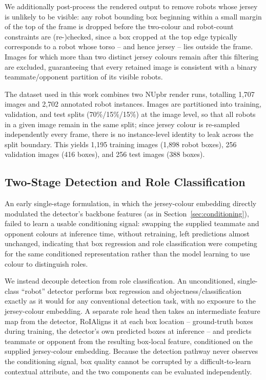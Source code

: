 \documentclass{article}
\begin{document}
We additionally post-process the rendered output to remove robots whose jersey is unlikely to be visible: any robot bounding box beginning within a small margin of the top of the frame is dropped before the two-colour and robot-count constraints are (re-)checked, since a box cropped at the top edge typically corresponds to a robot whose torso -- and hence jersey -- lies outside the frame. Images for which more than two distinct jersey colours remain after this filtering are excluded, guaranteeing that every retained image is consistent with a binary teammate/opponent partition of its visible robots.

The dataset used in this work combines two NUpbr render runs, totalling 1,707 images and 2,702 annotated robot instances. Images are partitioned into training, validation, and test splits (70\%/15\%/15\%) at the image level, so that all robots in a given image remain in the same split; since jersey colour is re-sampled independently every frame, there is no instance-level identity to leak across the split boundary. This yields 1,195 training images (1,898 robot boxes), 256 validation images (416 boxes), and 256 test images (388 boxes).

\subsection{Two-Stage Detection and Role Classification}

An early single-stage formulation, in which the jersey-colour embedding directly modulated the detector's backbone features (as in Section~\ref{sec:conditioning}), failed to learn a usable conditioning signal: swapping the supplied teammate and opponent colours at inference time, without retraining, left predictions almost unchanged, indicating that box regression and role classification were competing for the same conditioned representation rather than the model learning to use colour to distinguish roles.

We instead decouple detection from role classification. An unconditioned, single-class ``robot'' detector performs box regression and objectness/classification exactly as it would for any conventional detection task, with no exposure to the jersey-colour embedding. A separate role head then takes an intermediate feature map from the detector, RoIAligns it at each box location -- ground-truth boxes during training, the detector's own predicted boxes at inference -- and predicts teammate or opponent from the resulting box-local feature, conditioned on the supplied jersey-colour embedding. Because the detection pathway never observes the conditioning signal, box quality cannot be corrupted by a difficult-to-learn contextual attribute, and the two components can be evaluated independently.
\end{document}
